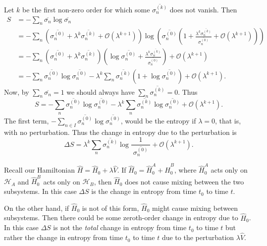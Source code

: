 \documentclass[11pt]{article}
\newcommand{\Od}[1]{\mathcal{O}{\left(#1\right)}}
\newcommand{\hilb}{\mathcal{H}}
\newcommand{\op}[1]{\hat{#1}}
\theoremstyle{theorem}
\theoremstyle{remark}
\theoremstyle{step}
\theoremstyle{gap}
\begin{document}
Let \(k\) be the first non-zero order for which some \(\overline{\sigma_n^{(k)}}\) does not vanish. Then
\begin{align*}
S &= -\sum_{n} \overline{\sigma_n} \log \overline{\sigma_n}\\
&= - \sum_{n} \left(\overline{\sigma_n^{(0)}} + \lambda^k \overline{\sigma_n^{(k)}} + \Od{\lambda^{k+1}}\right) \log \left(\overline{\sigma_n^{(0)}} \left(1 + \frac{\lambda^k \overline{\sigma_n^{(k)}}}{\overline{\sigma_n^{(0)}}} + \Od{\lambda^{k+1}}\right)\right) \\
&= - \sum_{n} \left(\overline{\sigma_n^{(0)}} + \lambda^k \overline{\sigma_n^{(k)}}\right) \left(\log \overline{\sigma_n^{(0)}} + \frac{\lambda^k \overline{\sigma_n^{(k)}}}{\overline{\sigma_n^{(0)}}}\right) + \Od{\lambda^{k+1}}\\
&= - \sum_{n} \overline{\sigma_n^{(0)}} \log \overline{\sigma_n^{(0)}} - \lambda^k \sum_n \overline{\sigma_n^{(k)}} \left(1+ \log\overline{\sigma_n^{(0)}}\right) + \Od{\lambda^{k+1}}.
\end{align*}
Now, by \(\sum_n \overline{\sigma_n} = 1\) we should always have \(\sum_n \overline{\sigma_n^{(k)}} = 0\). Thus
\[
S = - \sum_{n} \overline{\sigma_n^{(0)}} \log \overline{\sigma_n^{(0)}} - \lambda^k \sum_n \overline{\sigma_n^{(k)}} \log\overline{\sigma_n^{(0)}} + \Od{\lambda^{k+1}}.
\]
The first term, \(- \sum_{n \in I} \overline{\sigma_n^{(0)}} \log \overline{\sigma_n^{(0)}}\), would be the entropy if \(\lambda=0\), that is, with no perturbation. Thus the change in entropy due to the perturbation is
\begin{equation}
\boxed{\Delta S = 
\lambda^k \sum_n \overline{\sigma_n^{(k)}} \log\frac{1}{\;\overline{\sigma_n^{(0)}}\;} + \Od{\lambda^{k+1}}.}
\end{equation}

Recall our Hamiltonian \(\op{H} = \op{H}_0 + \lambda \op{V}\).
If \(\op{H}_0 = \op{H}_0^A + \op{H}_0^B\), where \(\op{H}_0^A\) acts only on \(\hilb_A\) and \(\op{H}_0^B\) acts only on \(\hilb_B\), then \(\op{H}_0\) does not cause mixing between the two subsystems. In this case \(\Delta S\) is the change in entropy from time \(t_0\) to time \(t\).

On the other hand, if \(\op{H}_0\) is not of this form, \(\op{H}_0\) might cause mixing between subsystems. Then there could be some zeroth-order change in entropy due to \(\op{H}_0\). In this case \(\Delta S\) is not the \emph{total} change in entropy from time \(t_0\) to time \(t\) but rather the change in entropy from time \(t_0\) to time \(t\) due to the perturbation \(\lambda \op{V}\).
\end{document}
